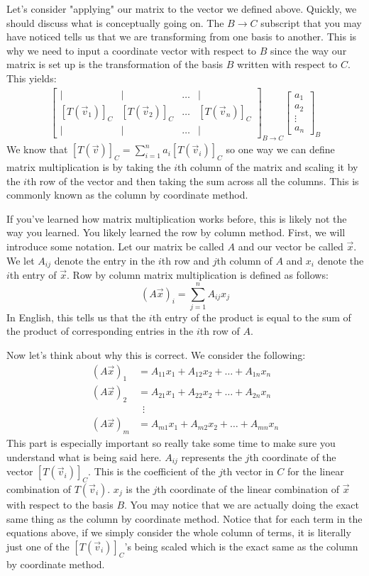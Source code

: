 Let's consider "applying" our matrix to the vector we defined above. Quickly, we should discuss what is conceptually going on. The $B\to C$ subscript that you may have noticed tells us that we are transforming from one basis to another. This is why we need to input a coordinate vector with respect to $B$ since the way our matrix is set up is the transformation of the basis $B$ written with respect to $C$. This yields:
\begin{align*}
    \begin{bmatrix}
    \vert & \vert & \ldots & \vert \\
    [T(\vec{v}_1)]_C & [T(\vec{v}_2)]_C & \ldots & [T(\vec{v}_n)]_C \\
    \vert & \vert & \ldots & \vert
\end{bmatrix}_{B\to C}\begin{bmatrix}
    a_1 \\ a_2 \\ \vdots \\ a_n
\end{bmatrix}_B
\end{align*}
We know that $[T(\vec{v})]_C=\sum_{i=1}^n a_i[T(\vec{v}_i)]_C$ so one way we can define matrix multiplication is by taking the $i$th column of the matrix and scaling it by the $i$th row of the vector and then taking the sum across all the columns. This is commonly known as the column by coordinate method. 

If you've learned how matrix multiplication works before, this is likely not the way you learned. You likely learned the row by column method. First, we will introduce some notation. Let our matrix be called $A$ and our vector be called $\vec{x}$. We let $A_{ij}$ denote the entry in the $i$th row and $j$th column of $A$ and $x_i$ denote the $i$th entry of $\vec{x}$. Row by column matrix multiplication is defined as follows:
$$(A\vec{x})_{i}=\sum_{j=1}^n A_{ij}x_j$$
In English, this tells us that the $i$th entry of the product is equal to the sum of the product of corresponding entries in the $i$th row of $A$.

Now let's think about why this is correct. We consider the following:
\begin{align*}
    (A\vec{x})_1&=A_{11}x_1+A_{12}x_2+\ldots+A_{1n}x_n\\
    (A\vec{x})_2&=A_{21}x_1+A_{22}x_2+\ldots+A_{2n}x_n\\
    &\,\,\,\vdots\\
    (A\vec{x})_m&=A_{m1}x_1+A_{m2}x_2+\ldots+A_{mn}x_n
\end{align*}
This part is especially important so really take some time to make sure you understand what is being said here. $A_{ij}$ represents the $j$th coordinate of the vector $[T(\vec{v}_i)]_C$. This is the coefficient of the $j$th vector in $C$ for the linear combination of $T(\vec{v}_i)$. $x_j$ is the $j$th coordinate of the linear combination of $\vec{x}$ with respect to the basis $B$. You may notice that we are actually doing the exact same thing as the column by coordinate method. Notice that for each term in the equations above, if we simply consider the whole column of terms, it is literally just one of the $[T(\vec{v}_i)]_C$'s being scaled which is the exact same as the column by coordinate method. 

